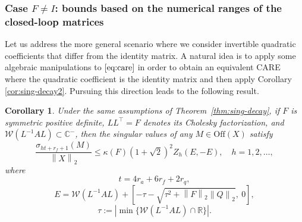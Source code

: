 \documentclass[a4paper,10pt]{article}
\newcommand{\norm}[1]{\left\lVert#1\right\rVert}
\newtheorem{corollary}[definition]{Corollary}
\begin{document}
\subsubsection{Case $F\neq I$: bounds based on the numerical ranges of the closed-loop matrices} \label{sec:2.2.2}
Let us address the more general scenario where we consider invertible quadratic coefficients that differ from the identity matrix. A natural idea is to apply some algebraic manipulations to $\eqref{eq:care}$ in order to obtain an equivalent CARE where the quadratic coefficient is the identity matrix and then apply Corollary \ref{cor:sing-decay2}. Pursuing this direction leads to the following result. 
\begin{corollary}\label{cor:sing-decay3}
	Under the same assumptions of Theorem~\ref{thm:sing-decay}, if $F$ is symmetric positive definite, $LL^\top=F$ denotes its Cholesky factorization, and $\mathcal W(L^{-1}AL)\subset \mathbb C^-$,  then the singular values of  any $M\in\mathrm{Off}(X)$   satisfy
	$$
	\frac{\sigma_{ht+r_f+1}(M)}{\norm{X}_2}\le \kappa(F)(1+\sqrt{2})^2 Z_h(E,-E),
	\quad h=1,2,\dots,
	$$
	where $$t=4r_a+6r_f+2r_q,$$
	 $$
	 E=\mathcal W(L^{-1}AL) + \left[-\tau -\sqrt{\tau^2+\norm{F}_2\norm{Q}_2},\ 0\right],
	 $$
	   $$\tau:= |\min\{\mathcal W(L^{-1}AL)\cap \mathbb R\}|.$$   
\end{corollary}
\end{document}
